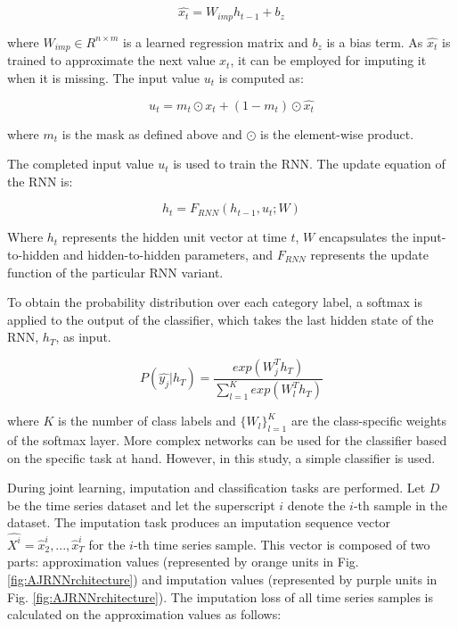 \begin{equation}
  \hat{x_t} = W_{imp} h_{t-1} + b_z
\end{equation}

where $W_{imp} \in R^{n \times  m}$ is a learned regression matrix and $b_z$ is a bias term. 
As $\hat{x_t}$ is trained to approximate the next value $x_t$, it can be employed for imputing it when it is missing.
The input value $u_t$ is computed as:

\begin{equation}
  u_t = m_t \odot x_t + (1 - m_t) \odot \hat{x_t}
  \label{eq:AJRNNinput}
\end{equation}

where $m_t$ is the mask as defined above and $\odot$ is the element-wise product.

The completed input value $u_t$ is used to train the RNN.
The update equation of the RNN is:

\begin{equation}
  h_t = F_{RNN} (h_{t-1}, u_t; W)
\end{equation}

Where $h_t$ represents the hidden unit vector at time $t$, $W$ encapsulates the input-to-hidden and hidden-to-hidden parameters, and $F_{RNN}$ represents the update function of the particular RNN variant.

To obtain the probability distribution over each category label, a softmax is applied to the output of the classifier, which takes the last hidden state of the RNN, $h_T$, as input.

\begin{equation}
  P(\hat{y_j}|h_T ) = \frac{exp(W^T_j  h_T )}{\sum_{l=1}^K exp(W^T_l  h_T )}
  \label{eq:AJRNNsoftmax}
\end{equation}

where $K$ is the number of class labels and $\{W_l\}^K_{l=1}$ are the class-specific weights of the softmax layer.
More complex networks can be used for the classifier based on the specific task at hand. However, in this study, a simple classifier is used.



During joint learning, imputation and classification tasks are performed. 
Let $D$ be the time series dataset and let the superscript $i$ denote the $i$-th sample in the dataset.
The imputation task produces an imputation sequence vector $\hat{X^i} = { \hat{x}^i_2, ..., \hat{x}^i_T }$ for the $i$-th time series sample.
This vector is composed of two parts: approximation values (represented by orange units in Fig. \ref{fig:AJRNNrchitecture}) and imputation values (represented by purple units in Fig. \ref{fig:AJRNNrchitecture}).  
The imputation loss of all time series samples is calculated on the approximation values as follows:

